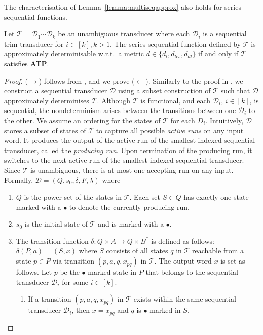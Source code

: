\documentclass[a4paper,UKenglish,cleveref, autoref, thm-restate,authorcolumns, colorlinks]{lipics-v2021}
\newcommand\calD{\mathcal{D}}
\newcommand\calT{\mathcal{T}}
\newcommand{\ATP}[0]{\textbf{ATP}}
\begin{document}
{The characterisation of Lemma~\ref{lemma:multiseqapprox} also holds for series-sequential functions.
\begin{lemma} \label{lemma:seriesseqapprox}
    Let $\calT = \calD_1 \cdots \calD_k$  be an unambiguous transducer where each $\calD_i$ is a sequential trim transducer for $i \in [k], k>1$. The series-sequential function defined by $\calT$ is approximately determinisable w.r.t.~a metric $d \in \{d_l,d_{lcs},d_{dl}\}$ if and only if $\calT$ satisfies \ATP{}.
\end{lemma}

\begin{proof}
    ($\rightarrow$) follows from , and we prove
    ($\leftarrow$).
    Similarly to the proof in , we construct a sequential transducer $\calD$ using a subset construction of $\calT$ such that $\calD$ approximately determinises $\calT$. Although $\calT$ is functional, and each $\calD_i$, $i \in [k]$, is sequential, the nondeterminism arises between the transitions between one $\calD_i$ to the other. We assume an ordering for the states of $\calT$ for each $D_i$. Intuitively, $\calD$ stores a subset of states of $\calT$ to capture all possible \emph{active runs} on any input word. It produces the output of the active run of the smallest indexed sequential transducer, called the \emph{producing run}. Upon termination of the producing run, it switches to the next active run of the smallest indexed sequential transducer. Since $\calT$ is unambiguous, there is at most one accepting run on any input. Formally, $\calD = (Q,s_0,\delta,F,\lambda)$  where
    \begin{enumerate}
        \item $Q$ is the power set of the states in $\calT$. Each set $S \in Q$ has exactly one state marked with a $\bullet$ to denote the currently producing run.
        \item $s_0$ is the initial state of $\calT$ and is marked with a $\bullet$.
        \item The transition function $\delta: Q \times A \rightarrow Q \times B^*  $ is defined as follows: $\delta(P,a)=(S,x)$ where $S$ consists of all states $q$ in $\calT$ reachable from a state $p \in P$ via transition $(p,a,q,x_{pq})$ in $\calT$. The output word $x$ is set as follows. Let $p$ be the $\bullet$ marked state in $P$ that belongs to the sequential transducer $\calD_i$ for some $i \in [k]$.
        \begin{enumerate}
            \item If a transition $(p,a,q,x_{pq})$ in $\calT$ exists within the same sequential transducer $\calD_i$, then $x=x_{pq}$ and $q$ is $\bullet$ marked in $S$. 

\end{enumerate}
\end{enumerate}
\end{proof}}
\end{document}
